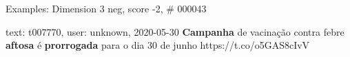 \begin{frame}{Examples: Dimension 3 neg, score -2, \# 000043}
\footnotesize
\begin{alertblock}{text: t007770, user: unknown, 2020-05-30}
\textbf{Campanha} de vacinação contra febre \textbf{aftosa} é 
\textbf{prorrogada} para o dia 30 de junho https://t.co/o5GAS8cIvV 
\end{alertblock}
\end{frame}
